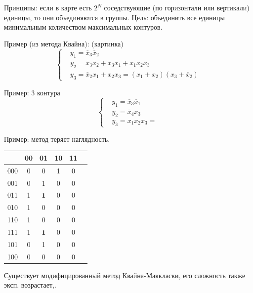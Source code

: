\documentclass[a4paper,12pt]{report}
\begin{document}
Принципы: если в карте есть $2^N$ соседствующие (по горизонтали или вертикали) единицы, то они объединяются в группы. Цель: объединить все единицы минимальным количеством максимальных контуров.

Пример (из метода Квайна):
(картинка)
\begin{equation}
\left\{
\begin{aligned}
&y_1=\overline{x}_3\overline{x}_2\\
&y_2=\overline{x}_3\overline{x}_2+\overline{x}_3\overline{x}_1+x_1x_2x_3\\
&y_3=\overline{x}_2x_1+x_2x_3=(x_1+x_2)(x_3+\overline{x}_2)
\end{aligned}
\right.
\end{equation}

Пример: 3 контура
\begin{equation}
\left\{
\begin{aligned}
&y_1=\overline{x}_3\overline{x}_1\\
&y_2=\overline{x}_4x_3\\
&y_3=x_1x_2x_3=
\end{aligned}
\right.
\end{equation}

Пример: метод теряет наглядность.
\begin{tabular}{ c | c | c | c | c | c}
        & 00 & 01 & 10 & 11\\ \hline
  000 & 0 & 0 & 1 & 0 \\
  001 & 0 & 1 & 0 & 0\\
  011 & 1 & $\textbf{1}$ & 0 & 0\\
  010 & 1 & 0 & 0 & 0 \\  
  110 & 1 & 0 & 0 & 0 \\
  111 & 1 & $\textbf{1}$ & 0 & 0 \\
  101 & 0 & 1 & 0 & 0 \\
  100 & 0 & 0 & 0 & 0 \\
\end{tabular}
 Существует модифицированный метод Квайна-Маккласки, его сложность также эксп. возрастает,.
\end{document}
